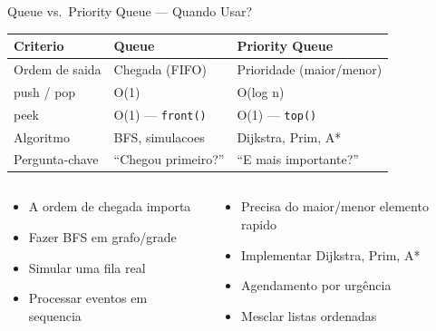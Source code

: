 \documentclass[aspectratio=169,10pt]{beamer}
\begin{document}
\begin{frame}{Queue vs.\ Priority Queue --- Quando Usar?}
  \begin{tcolorbox}[caixaAzul,title={Tabela Comparativa}]
    \centering\footnotesize
    \begin{tabular}{lll}
      \toprule
      \textbf{Criterio} & \textbf{Queue} & \textbf{Priority Queue}\\
      \midrule
      Ordem de saida & Chegada (FIFO) & Prioridade (maior/menor)\\
      push / pop     & O(1) & O(log n)\\
      peek           & O(1) --- \texttt{front()} & O(1) --- \texttt{top()}\\
      Algoritmo      & BFS, simulacoes & Dijkstra, Prim, A*\\
      Pergunta-chave & ``Chegou primeiro?'' & ``E mais importante?''\\
      \bottomrule
    \end{tabular}
  \end{tcolorbox}
  \vspace{0.1cm}
  \begin{columns}[t]
      \begin{tcolorbox}[caixaLaranja,title={Use Queue quando...}]
        \begin{itemize}\footnotesize
          \item A ordem de chegada importa
          \item Fazer BFS em grafo/grade
          \item Simular uma fila real
          \item Processar eventos em sequencia
        \end{itemize}
      \end{tcolorbox}
      \begin{tcolorbox}[caixaRoxa,title={Use Priority Queue quando...}]
        \begin{itemize}\footnotesize
          \item Precisa do maior/menor elemento rapido
          \item Implementar Dijkstra, Prim, A*
          \item Agendamento por urgência
          \item Mesclar listas ordenadas
        \end{itemize}
      \end{tcolorbox}
  \end{columns}
\end{frame}
\end{document}
